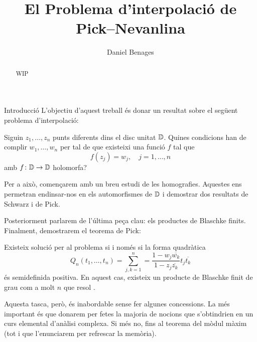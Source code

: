 \documentclass[dvipsnames, svgnames, leqno, a4paper, 12pt]{report}
\title{El Problema d'interpolació de Pick--Nevanlina}
\date{}
\author{Daniel Benages}
\begin{document}
    \maketitle
    \begin{abstract}
        WIP
    \end{abstract}
    \begin{chapter}{Introducció}
        L'objectiu d'aquest treball és donar un resultat sobre el següent problema d'interpolació:
        \begin{problem}
            Siguin $z_1,\dots,z_n$ punts diferents dins el disc unitat $\mathbb{D}$. Quines condicions han de complir $w_1,\dots,w_n$ per tal de que existeixi una funció $f$ tal que \begin{equation}\label{problema}
                f(z_j)=w_j,\quad j=1,\dots,n
            \end{equation}
            amb $f\colon\mathbb{D}\to\mathbb{D}$ holomorfa?
        \end{problem}
        Per a això, començarem amb un breu estudi de les homografies. Aquestes ens permetran endinsar-nos en els automorfismes de \(\mathbb{D}\) i demostrar dos resultats de Schwarz i de Pick.

        Posteriorment parlarem de l'última peça clau: els productes de Blaschke finits. Finalment, demostrarem el teorema de Pick:
        \begin{theorem*}[Pick]
            Existeix solució per al problema \normalfont{\ref{problema}} si i només si la forma quadràtica \begin{displaymath}
                Q_n(t_1,\dots,t_n)=\sum_{j,k=1}^n=\frac{1-w_j\overline{w_k}}{1-z_j\overline{z_k}}t_j\overline{t_k}
            \end{displaymath}
            és semidefinida positiva. En aquest cas, existeix un producte de Blaschke finit de grau com a molt $n$ que resol \normalfont{\ref{problema}}.
        \end{theorem*}

        Aquesta tasca, però, és inabordable sense fer algunes concessions. La més important és que donarem per fetes la majoria de nocions que s'obtindrien en un curs elemental d'anàlisi complexa. Si més no, fins al teorema del mòdul màxim (tot i que l'enunciarem per refrescar la memòria).
    \end{chapter}
\end{document}
